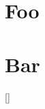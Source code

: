 \documentclass{article}
\begin{document}
\section{Foo}
\label{foo}

\section{Bar}
\label{bar}

\ref{}
\end{document}

